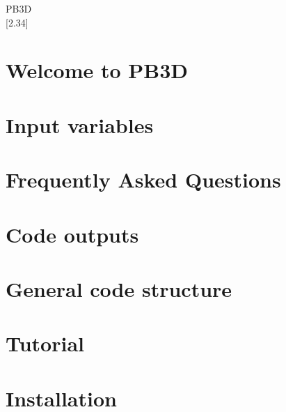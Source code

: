 \documentclass[twoside]{book}
\newcommand{\+}{\discretionary{\mbox{\scriptsize$\hookleftarrow$}}{}{}}
\newcommand{\clearemptydoublepage}{%
  \newpage{\pagestyle{empty}\cleardoublepage}%
}
\begin{document}
\hypersetup{pageanchor=false,
             bookmarksnumbered=true,
             pdfencoding=unicode
            }
\begin{titlepage}
\vspace*{7cm}
\begin{center}%
{\color{stylecolor} \TitleFont\fontsize{72}{80} \selectfont P\+B3D \\}
\vspace*{1cm}
{\large \mbox{[}2.\+34\mbox{]} }\\
\vspace*{1cm}
\end{center}
\end{titlepage}
\clearemptydoublepage
{}
\tableofcontents
\clearemptydoublepage
{}
\hypersetup{pageanchor=true}

\chapter{Welcome to P\+B3D}
\label{index}\hypertarget{index}{}
\chapter{Input variables}
\label{page_inputs}

\chapter{Frequently Asked Questions}
\label{page_faq}

\chapter{Code outputs}
\label{page_outputs}

\chapter{General code structure}
\label{page_overview}

\chapter{Tutorial}
\label{page_tutorial}

\chapter{Installation}
\label{page_installation}

\end{document}
